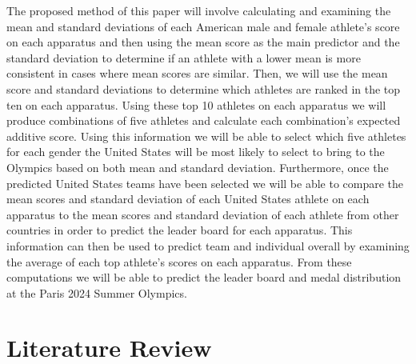 \documentclass[12pt]{article}
\begin{document}
The proposed method of this paper will involve calculating and examining the mean and standard 
deviations of each American male and female athlete's score on each apparatus and then using the 
mean score as the main predictor and the standard deviation to determine if an athlete with a lower 
mean is more consistent in cases where mean scores are similar. Then, we will use the mean score and 
standard deviations to determine which athletes are ranked in the top ten on each apparatus. Using 
these top 10 athletes on each apparatus we will produce combinations of five athletes and calculate 
each combination's expected additive score. Using this information we will be able to select which 
five athletes for each gender the United States will be most likely to select to bring to the Olympics 
based on both mean and standard deviation. Furthermore, once the predicted United States teams have 
been selected we will be able to compare the mean scores and standard deviation of each United States 
athlete on each apparatus to the mean scores and standard deviation of each athlete from other countries 
in order to predict the leader board for each apparatus. This information can then be used to predict 
team and individual overall by examining the average of each top athlete's scores on each apparatus. 
From these computations we will be able to predict the leader board and medal distribution at the Paris 
2024 Summer Olympics.

\section{Literature Review}
\label{sec:lit}
\end{document}

